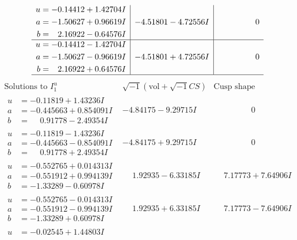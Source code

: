 \documentclass[1p]{elsarticle_modified}
\theoremstyle{definition}
\newcommand{\I}{\sqrt{-1}}
\begin{document}
$$\begin{array}{c|c|c}
\begin{aligned}
u &= -0.14412 + 1.42704 I \\
a &= -1.50627 + 0.96619 I \\
b &= \phantom{-}2.16922 - 0.64576 I\end{aligned}
 & -4.51801 - 4.72556 I & \phantom{-0.000000 } 0 \\ \hline\begin{aligned}
u &= -0.14412 - 1.42704 I \\
a &= -1.50627 - 0.96619 I \\
b &= \phantom{-}2.16922 + 0.64576 I\end{aligned}
 & -4.51801 + 4.72556 I & \phantom{-0.000000 } 0\\
 \hline 
 \end{array}$$\newpage$$\begin{array}{c|c|c}  
\text{Solutions to }I^u_{1}& \I (\text{vol} + \sqrt{-1}CS) & \text{Cusp shape}\\
 \hline 
\begin{aligned}
u &= -0.11819 + 1.43236 I \\
a &= -0.445663 + 0.854091 I \\
b &= \phantom{-}0.91778 - 2.49354 I\end{aligned}
 & -4.84175 - 9.29715 I & \phantom{-0.000000 } 0 \\ \hline\begin{aligned}
u &= -0.11819 - 1.43236 I \\
a &= -0.445663 - 0.854091 I \\
b &= \phantom{-}0.91778 + 2.49354 I\end{aligned}
 & -4.84175 + 9.29715 I & \phantom{-0.000000 } 0 \\ \hline\begin{aligned}
u &= -0.552765 + 0.014313 I \\
a &= -0.551912 + 0.994139 I \\
b &= -1.33289 - 0.60978 I\end{aligned}
 & \phantom{-}1.92935 - 6.33185 I & \phantom{-}7.17773 + 7.64906 I \\ \hline\begin{aligned}
u &= -0.552765 - 0.014313 I \\
a &= -0.551912 - 0.994139 I \\
b &= -1.33289 + 0.60978 I\end{aligned}
 & \phantom{-}1.92935 + 6.33185 I & \phantom{-}7.17773 - 7.64906 I \\ \hline\begin{aligned}
u &= -0.02545 + 1.44803 I \\

\end{aligned}
\end{array}$$
\end{document}
